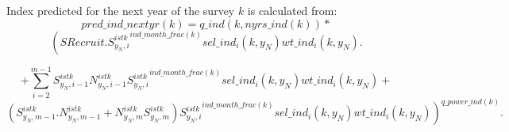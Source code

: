 \documentclass{article}
\begin{document}

Index predicted for the next year of the survey $k$ is calculated from:
\begin{equation}
    pred\_ind\_nextyr(k)=q\_ind(k,nyrs\_ind(k)) * 
\end{equation}
\begin{equation*}
    \left( SRecruit. {S^{istk}_{y_N,i}}^{ind\_month\_frac(k)} sel\_ind_i(k,y_N)  wt\_ind_i(k,y_N).\right.
\end{equation*}

\begin{equation}
+\sum_{i=2}^{m-1}S^{istk}_{y_N,i-1}N^{istk}_{y_N,i-1}{S^{istk}_{y_N,i}}^{ind\_month\_frac(k)} sel\_ind_i(k,y_N)  wt\_ind_i(k,y_N)+
\end{equation}
\begin{equation*}
  \left. (S^{istk}_{y_N,m-1}.N^{istk}_{y_N,m-1}+N^{istk}_{y_N,m}S^{istk}_{y_N,m}){S^{istk}_{y_N,i}}^{ind\_month\_frac(k)} sel\_ind_i(k,y_N)  wt\_ind_i(k,y_N) \right)^{q\_power\_ind(k)}.
\end{equation*}
\end{document}
